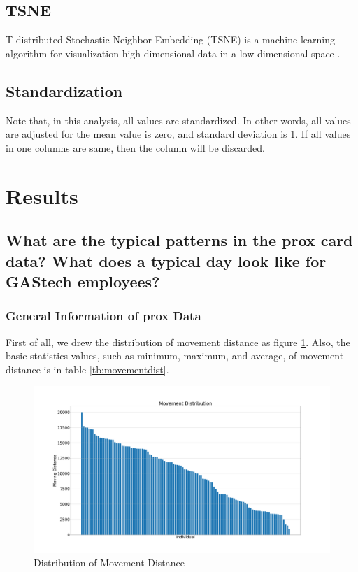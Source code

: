 \documentclass[aps, 10pt, a4paper]{article}
\begin{document}
        \subsection{TSNE}
            T-distributed Stochastic Neighbor Embedding (TSNE) is a machine learning algorithm for visualization high-dimensional data in a low-dimensional space \cite{ref:tsne1}.
         
        \subsection{Standardization}
            Note that, in this analysis, all values are standardized. In other words, all values are adjusted for the mean value is zero, and standard deviation is 1. If all values in one columns are same, then the column will be discarded. 
    
    \section{Results}
        \subsection[Question 1]{What are the typical patterns in the prox card data? What does a typical day look like for GAStech employees?}
            \label{sec:question1}
            \subsubsection{General Information of prox Data}
                First of all, we drew the distribution of movement distance as figure \ref{fig:movementdist}. Also, the basic statistics values, such as minimum, maximum, and average, of movement distance is in table \ref{tb:movementdist}.
            
                \begin{figure}[htbp]
                    \centering
                    \includegraphics[width=0.6 \linewidth]{figures/movementdistribution.png}
                    \caption{Distribution of Movement Distance}
                    \label{fig:movementdist}
                \end{figure}
        
\end{document}
